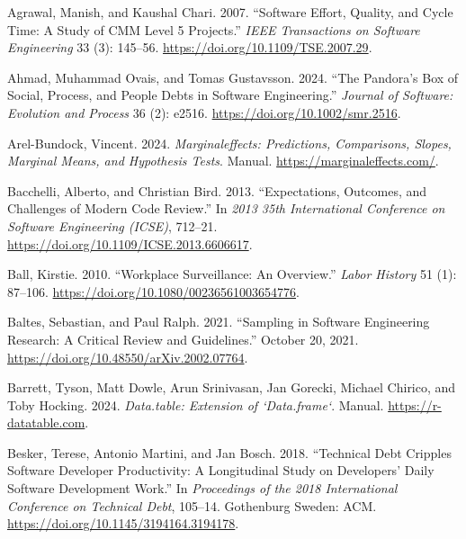 \documentclass[
]{article}
\newlength{\cslhangindent}
\newenvironment{CSLReferences}[2] %
 {\begin{list}{}{%
  \setlength{\itemindent}{0pt}
  \setlength{\leftmargin}{0pt}
  \setlength{\parsep}{0pt}
  \ifodd #1
   \setlength{\leftmargin}{\cslhangindent}
   \setlength{\itemindent}{-1\cslhangindent}
  \fi
  \setlength{\itemsep}{#2\baselineskip}}}
 {\end{list}}
\begin{document}
\label{refs}
\begin{CSLReferences}{1}{0}
Agrawal, Manish, and Kaushal Chari. 2007. {``Software {Effort},
{Quality}, and {Cycle Time}: {A Study} of {CMM Level} 5 {Projects}.''}
\emph{IEEE Transactions on Software Engineering} 33 (3): 145--56.
\url{https://doi.org/10.1109/TSE.2007.29}.

Ahmad, Muhammad Ovais, and Tomas Gustavsson. 2024. {``The {Pandora}'s
Box of Social, Process, and People Debts in Software Engineering.''}
\emph{Journal of Software: Evolution and Process} 36 (2): e2516.
\url{https://doi.org/10.1002/smr.2516}.

Arel-Bundock, Vincent. 2024. \emph{Marginaleffects: {Predictions},
Comparisons, Slopes, Marginal Means, and Hypothesis Tests}. Manual.
\url{https://marginaleffects.com/}.

Bacchelli, Alberto, and Christian Bird. 2013. {``Expectations, Outcomes,
and Challenges of Modern Code Review.''} In \emph{2013 35th
{International Conference} on {Software Engineering} ({ICSE})}, 712--21.
\url{https://doi.org/10.1109/ICSE.2013.6606617}.

Ball, Kirstie. 2010. {``Workplace Surveillance: An Overview.''}
\emph{Labor History} 51 (1): 87--106.
\url{https://doi.org/10.1080/00236561003654776}.

Baltes, Sebastian, and Paul Ralph. 2021. {``Sampling in {Software
Engineering Research}: {A Critical Review} and {Guidelines}.''} October
20, 2021. \url{https://doi.org/10.48550/arXiv.2002.07764}.

Barrett, Tyson, Matt Dowle, Arun Srinivasan, Jan Gorecki, Michael
Chirico, and Toby Hocking. 2024. \emph{Data.table: {Extension} of
`Data.frame`}. Manual. \url{https://r-datatable.com}.

Besker, Terese, Antonio Martini, and Jan Bosch. 2018. {``Technical Debt
Cripples Software Developer Productivity: A Longitudinal Study on
Developers' Daily Software Development Work.''} In \emph{Proceedings of
the 2018 {International Conference} on {Technical Debt}}, 105--14.
Gothenburg Sweden: ACM. \url{https://doi.org/10.1145/3194164.3194178}.


\end{CSLReferences}
\end{document}
